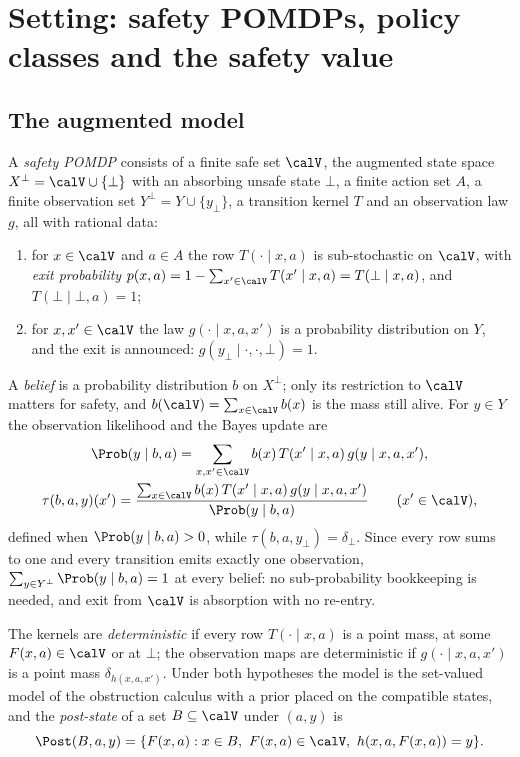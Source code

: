 \section{Setting: safety POMDPs, policy classes and the safety value}\label{sec:setting}

\subsection{The augmented model}

\begin{definition}\label{def:model}
A \emph{safety POMDP} consists of a finite safe set $\calV$, the augmented state space $X^{\bot}=\calV\cup\{\bot\}$ with an absorbing unsafe state $\bot$, a finite action set $A$, a finite observation set $Y^{\bot}=Y\cup\{y_{\bot}\}$, a transition kernel $T$ and an observation law $g$, all with rational data:
\begin{enumerate}[leftmargin=1.6em,itemsep=1pt]
\item for $x\in\calV$ and $a\in A$ the row $T(\cdot\mid x,a)$ is sub-stochastic on $\calV$, with \emph{exit probability} $p(x,a)=1-\sum_{x'\in\calV}T(x'\mid x,a)=T(\bot\mid x,a)$, and $T(\bot\mid\bot,a)=1$;
\item for $x,x'\in\calV$ the law $g(\cdot\mid x,a,x')$ is a probability distribution on $Y$, and the exit is announced: $g(y_{\bot}\mid\cdot,\cdot,\bot)=1$.
\end{enumerate}
A \emph{belief} is a probability distribution $b$ on $X^{\bot}$; only its restriction to $\calV$ matters for safety, and $b(\calV)=\sum_{x\in\calV}b(x)$ is the mass still alive. For $y\in Y$ the observation likelihood and the Bayes update are
\begin{gather*}
\Prob(y\mid b,a)=\sum_{x,x'\in\calV}b(x)\,T(x'\mid x,a)\,g(y\mid x,a,x'),\\
\tau(b,a,y)(x')=\frac{\sum_{x\in\calV}b(x)\,T(x'\mid x,a)\,g(y\mid x,a,x')}{\Prob(y\mid b,a)}\qquad(x'\in\calV),
\end{gather*}
defined when $\Prob(y\mid b,a)>0$, while $\tau(b,a,y_{\bot})=\delta_{\bot}$. Since every row sums to one and every transition emits exactly one observation, $\sum_{y\in Y^{\bot}}\Prob(y\mid b,a)=1$ at every belief: no sub-probability bookkeeping is needed, and exit from $\calV$ is absorption with no re-entry.
\end{definition}

The kernels are \emph{deterministic} if every row $T(\cdot\mid x,a)$ is a point mass, at some $F(x,a)\in\calV$ or at $\bot$; the observation maps are deterministic if $g(\cdot\mid x,a,x')$ is a point mass $\delta_{h(x,a,x')}$. Under both hypotheses the model is the set-valued model of the obstruction calculus \cite{Abaee2026calc} with a prior placed on the compatible states, and the \emph{post-state} of a set $B\subseteq\calV$ under $(a,y)$ is
\[
\Post(B,a,y)=\{F(x,a):x\in B,\ F(x,a)\in\calV,\ h(x,a,F(x,a))=y\}.
\]

